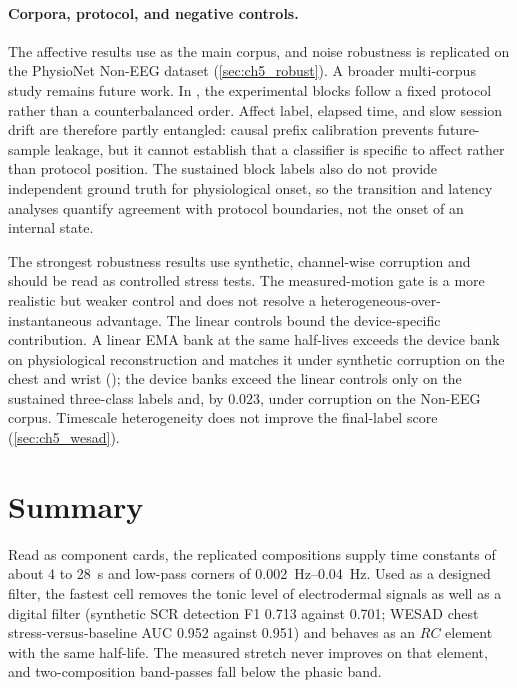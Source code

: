 \documentclass[12pt, twoside]{report}
\begin{document}
\paragraph{Corpora, protocol, and negative controls.} The affective results use \WESAD{} as the main corpus, and noise robustness is replicated on the PhysioNet Non-EEG dataset (\cref{sec:ch5_robust}). A broader multi-corpus study remains future work. In \WESAD{}, the experimental blocks follow a fixed protocol rather than a counterbalanced order. Affect label, elapsed time, and slow session drift are therefore partly entangled: causal prefix calibration prevents future-sample leakage, but it cannot establish that a classifier is specific to affect rather than protocol position. The sustained block labels also do not provide independent ground truth for physiological onset, so the transition and latency analyses quantify agreement with protocol boundaries, not the onset of an internal state.

The strongest robustness results use synthetic, channel-wise corruption and should be read as controlled stress tests. The measured-motion gate is a more realistic but weaker control and does not resolve a heterogeneous-over-instantaneous advantage. The linear controls bound the device-specific contribution. A linear EMA bank at the same half-lives exceeds the device bank on physiological reconstruction and matches it under synthetic corruption on the chest and wrist (); the device banks exceed the linear controls only on the sustained three-class labels and, by $0.023$, under corruption on the Non-EEG corpus. Timescale heterogeneity does not improve the final-label score (\cref{sec:ch5_wesad}).

\section{Summary}\label{sec:ch5_conclusions}

Read as component cards, the replicated compositions supply time constants of about 4 to \SI{28}{\second} and low-pass corners of \SIrange{0.002}{0.04}{\hertz}. Used as a designed filter, the fastest cell removes the tonic level of electrodermal signals as well as a digital filter (synthetic SCR detection F1 \num{0.713} against \num{0.701}; WESAD chest stress-versus-baseline AUC \num{0.952} against \num{0.951}) and behaves as an $RC$ element with the same half-life. The measured stretch never improves on that element, and two-composition band-passes fall below the phasic band.
\end{document}
